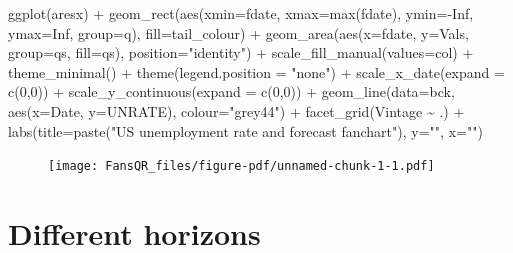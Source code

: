 \documentclass[
  letterpaper,
]{book}
\newenvironment{Shaded}{\begin{snugshade}}{\end{snugshade}}
\newcommand{\AttributeTok}[1]{\textcolor[rgb]{0.40,0.45,0.13}{#1}}
\newcommand{\ConstantTok}[1]{\textcolor[rgb]{0.56,0.35,0.01}{#1}}
\newcommand{\DecValTok}[1]{\textcolor[rgb]{0.68,0.00,0.00}{#1}}
\newcommand{\FunctionTok}[1]{\textcolor[rgb]{0.28,0.35,0.67}{#1}}
\newcommand{\NormalTok}[1]{\textcolor[rgb]{0.00,0.23,0.31}{#1}}
\newcommand{\SpecialCharTok}[1]{\textcolor[rgb]{0.37,0.37,0.37}{#1}}
\newcommand{\StringTok}[1]{\textcolor[rgb]{0.13,0.47,0.30}{#1}}
\begin{document}
\begin{Shaded}
\begin{Highlighting}[]
\FunctionTok{ggplot}\NormalTok{(aresx) }\SpecialCharTok{+}
  \FunctionTok{geom\_rect}\NormalTok{(}\FunctionTok{aes}\NormalTok{(}\AttributeTok{xmin=}\NormalTok{fdate, }\AttributeTok{xmax=}\FunctionTok{max}\NormalTok{(fdate), }\AttributeTok{ymin=}\SpecialCharTok{{-}}\ConstantTok{Inf}\NormalTok{, }\AttributeTok{ymax=}\ConstantTok{Inf}\NormalTok{, }\AttributeTok{group=}\NormalTok{q), }\AttributeTok{fill=}\NormalTok{tail\_colour) }\SpecialCharTok{+}
  \FunctionTok{geom\_area}\NormalTok{(}\FunctionTok{aes}\NormalTok{(}\AttributeTok{x=}\NormalTok{fdate, }\AttributeTok{y=}\NormalTok{Vals, }\AttributeTok{group=}\NormalTok{qs, }\AttributeTok{fill=}\NormalTok{qs), }\AttributeTok{position=}\StringTok{"identity"}\NormalTok{) }\SpecialCharTok{+}
  \FunctionTok{scale\_fill\_manual}\NormalTok{(}\AttributeTok{values=}\NormalTok{col) }\SpecialCharTok{+}
  \FunctionTok{theme\_minimal}\NormalTok{() }\SpecialCharTok{+} 
  \FunctionTok{theme}\NormalTok{(}\AttributeTok{legend.position =} \StringTok{"none"}\NormalTok{) }\SpecialCharTok{+}
  \FunctionTok{scale\_x\_date}\NormalTok{(}\AttributeTok{expand =} \FunctionTok{c}\NormalTok{(}\DecValTok{0}\NormalTok{,}\DecValTok{0}\NormalTok{)) }\SpecialCharTok{+}
  \FunctionTok{scale\_y\_continuous}\NormalTok{(}\AttributeTok{expand =} \FunctionTok{c}\NormalTok{(}\DecValTok{0}\NormalTok{,}\DecValTok{0}\NormalTok{)) }\SpecialCharTok{+}
  \FunctionTok{geom\_line}\NormalTok{(}\AttributeTok{data=}\NormalTok{bck, }\FunctionTok{aes}\NormalTok{(}\AttributeTok{x=}\NormalTok{Date, }\AttributeTok{y=}\NormalTok{UNRATE), }\AttributeTok{colour=}\StringTok{"grey44"}\NormalTok{) }\SpecialCharTok{+} 
  \FunctionTok{facet\_grid}\NormalTok{(Vintage }\SpecialCharTok{\textasciitilde{}}\NormalTok{ .) }\SpecialCharTok{+}
  \FunctionTok{labs}\NormalTok{(}\AttributeTok{title=}\FunctionTok{paste}\NormalTok{(}\StringTok{"US unemployment rate and forecast fanchart"}\NormalTok{), }\AttributeTok{y=}\StringTok{""}\NormalTok{, }\AttributeTok{x=}\StringTok{""}\NormalTok{) }
\end{Highlighting}
\end{Shaded}

\begin{figure}[H]

{\centering \texttt{[image: FansQR\_files/figure-pdf/unnamed-chunk-1-1.pdf]}

}

\end{figure}

\hypertarget{different-horizons}{%
\section{Different horizons}\label{different-horizons}}
\end{document}
